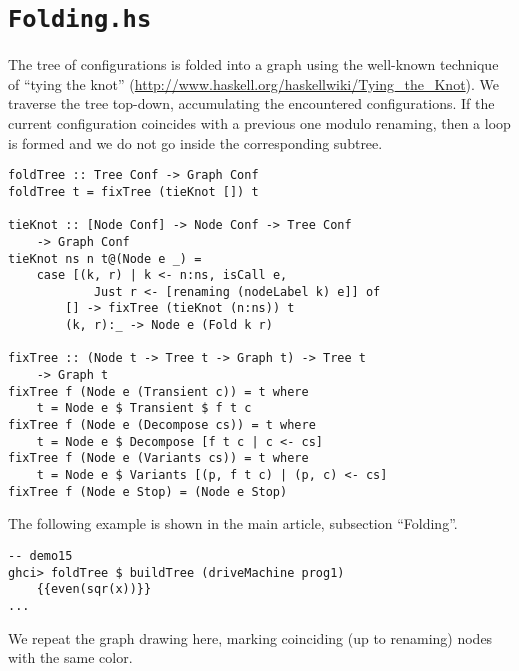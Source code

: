 \section{\texttt{Folding.hs}}

The tree of configurations is folded into a graph using the 
well-known technique of ``tying the knot''
(\url{http://www.haskell.org/haskellwiki/Tying_the_Knot}).
We traverse the tree top-down, accumulating the encountered configurations.
If the current configuration coincides with a previous one modulo renaming,
then a loop is formed and we do not go inside the corresponding subtree.

\begin{lstlisting}[name=folding]
foldTree :: Tree Conf -> Graph Conf
foldTree t = fixTree (tieKnot []) t

tieKnot :: [Node Conf] -> Node Conf -> Tree Conf 
	-> Graph Conf
tieKnot ns n t@(Node e _) =
	case [(k, r) | k <- n:ns, isCall e, 
			Just r <- [renaming (nodeLabel k) e]] of
		[] -> fixTree (tieKnot (n:ns)) t
		(k, r):_ -> Node e (Fold k r)

fixTree :: (Node t -> Tree t -> Graph t) -> Tree t 
	-> Graph t
fixTree f (Node e (Transient c)) = t where
	t = Node e $ Transient $ f t c
fixTree f (Node e (Decompose cs)) = t where
	t = Node e $ Decompose [f t c | c <- cs]
fixTree f (Node e (Variants cs)) = t where
	t = Node e $ Variants [(p, f t c) | (p, c) <- cs]
fixTree f (Node e Stop) = (Node e Stop)
\end{lstlisting}

The following example is shown in the main article, subsection ``Folding''.
\begin{lstlisting}[style=demo]
-- demo15
ghci> foldTree $ buildTree (driveMachine prog1) 
	{{even(sqr(x))}}
...

\end{lstlisting}

We repeat the graph drawing here, marking coinciding (up to renaming) nodes
with the same color.

\begin{landscape}

\end{landscape}
